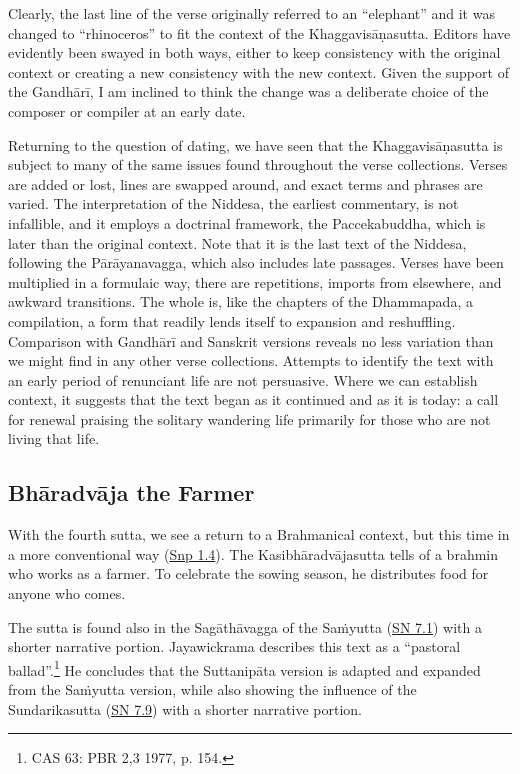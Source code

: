 \documentclass[12pt,openany]{book}%
\begin{document}
Clearly, the last line of the verse originally referred to an “elephant” and it was changed to “rhinoceros” to fit the context of the \textsanskrit{Khaggavisāṇasutta}. Editors have evidently been swayed in both ways, either to keep consistency with the original context or creating a new consistency with the new context. Given the support of the \textsanskrit{Gandhārī}, I am inclined to think the change was a deliberate choice of the composer or compiler at an early date.

Returning to the question of dating, we have seen that the \textsanskrit{Khaggavisāṇasutta} is subject to many of the same issues found throughout the verse collections. Verses are added or lost, lines are swapped around, and exact terms and phrases are varied. The interpretation of the Niddesa, the earliest commentary, is not infallible, and it employs a doctrinal framework, the Paccekabuddha, which is later than the original context. Note that it is the last text of the Niddesa, following the \textsanskrit{Pārāyanavagga}, which also includes late passages. Verses have been multiplied in a formulaic way, there are repetitions, imports from elsewhere, and awkward transitions. The whole is, like the chapters of the Dhammapada, a compilation, a form that readily lends itself to expansion and reshuffling. Comparison with \textsanskrit{Gandhārī} and Sanskrit versions reveals no less variation than we might find in any other verse collections. Attempts to identify the text with an early period of renunciant life are not persuasive. Where we can establish context, it suggests that the text began as it continued and as it is today: a call for renewal praising the solitary wandering life primarily for those who are not living that life.

\subsection*{\textsanskrit{Bhāradvāja} the Farmer}

With the fourth sutta, we see a return to a Brahmanical context, but this time in a more conventional way (\href{https://suttacentral.net/snp1.4/en/sujato}{Snp 1.4}). The \textsanskrit{Kasibhāradvājasutta} tells of a brahmin who works as a farmer. To celebrate the sowing season, he distributes food for anyone who comes.

The sutta is found also in the \textsanskrit{Sagāthāvagga} of the \textsanskrit{Saṁyutta} (\href{https://suttacentral.net/sn7.1}{SN 7.1}) with a shorter narrative portion. Jayawickrama describes this text as a “pastoral ballad”.\footnote{CAS 63: PBR 2,3 1977, p. 154. } He concludes that the \textsanskrit{Suttanipāta} version is adapted and expanded from the \textsanskrit{Saṁyutta} version, while also showing the influence of the Sundarikasutta (\href{https://suttacentral.net/sn7.9}{SN 7.9}) with a shorter narrative portion.
\end{document}
